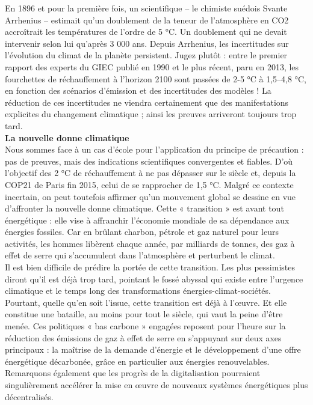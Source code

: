 \documentclass[8pt]{article}
\begin{document}
En 1896 et pour la première fois, un scientifique – le chimiste suédois Svante Arrhenius – estimait qu’un doublement de la teneur de l’atmosphère en CO2 accroîtrait les températures de l’ordre de 5 °C. Un doublement qui ne devait intervenir selon lui qu’après 3 000 ans.
Depuis Arrhenius, les incertitudes sur l’évolution du climat de la planète persistent. Jugez plutôt : entre le premier rapport des experts du GIEC publié en 1990 et le plus récent, paru en 2013, les fourchettes de réchauffement à l’horizon 2100 sont passées de 2-5 °C à 1,5–4,8 °C, en fonction des scénarios d’émission et des incertitudes des modèles !
La réduction de ces incertitudes ne viendra certainement que des manifestations explicites du changement climatique ; ainsi les preuves arriveront toujours trop tard.\\

\textbf{La nouvelle donne climatique}\\

Nous sommes face à un cas d’école pour l’application du principe de précaution : pas de preuves, mais des indications scientifiques convergentes et fiables. D’où l’objectif des 2 °C de réchauffement à ne pas dépasser sur le siècle et, depuis la COP21 de Paris fin 2015, celui de se rapprocher de 1,5 °C.
Malgré ce contexte incertain, on peut toutefois affirmer qu’un mouvement global se dessine en vue d’affronter la nouvelle donne climatique. Cette « transition » est avant tout énergétique : elle vise à affranchir l’économie mondiale de sa dépendance aux énergies fossiles. Car en brûlant charbon, pétrole et gaz naturel pour leurs activités, les hommes libèrent chaque année, par milliards de tonnes, des gaz à effet de serre qui s’accumulent dans l’atmosphère et perturbent le climat.\\

Il est bien difficile de prédire la portée de cette transition. Les plus pessimistes diront qu’il est déjà trop tard, pointant le fossé abyssal qui existe entre l’urgence climatique et le temps long des transformations énergies-climat-sociétés.
Pourtant, quelle qu’en soit l’issue, cette transition est déjà à l’œuvre. Et elle constitue une bataille, au moins pour tout le siècle, qui vaut la peine d’être menée.
Ces politiques « bas carbone » engagées reposent pour l’heure sur la réduction des émissions de gaz à effet de serre en s’appuyant sur deux axes principaux : la maîtrise de la demande d’énergie et le développement d’une offre énergétique décarbonée, grâce en particulier aux énergies renouvelables. Remarquons également que les progrès de la digitalisation pourraient singulièrement accélérer la mise en œuvre de nouveaux systèmes énergétiques plus décentralisés.\\
\end{document}
